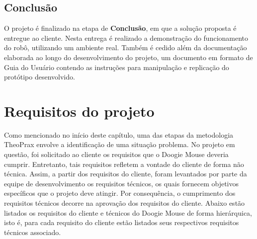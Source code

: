 \subsection{Conclusão}
\label{metodologia_conclusao}
O projeto é finalizado na etapa de \textbf{Conclusão}, em que a solução proposta é entregue ao cliente. Nesta entrega é realizado a demonstração do funcionamento do robô, utilizando um ambiente real. Também é cedido além da documentação elaborada ao longo do desenvolvimento do projeto, um documento em formato de Guia do Usuário contendo as instruções para manipulação e replicação do protótipo desenvolvido.


\section{Requisitos do projeto}
\label{sec:requisitos_do_projeto}
Como mencionado no início deste capítulo, uma das etapas da metodologia TheoPrax envolve a identificação de uma situação problema. No projeto em questão, foi solicitado ao cliente os requisitos que o Doogie Mouse deveria cumprir. Entretanto, tais requisitos refletem a vontade do cliente de forma não técnica. Assim, a partir dos requisitos do cliente, foram levantados por parte da equipe de desenvolvimento os requisitos técnicos, os quais fornecem objetivos específicos que o projeto deve atingir. Por consequência, o cumprimento dos requisitos técnicos decorre na aprovação dos requisitos do cliente. Abaixo estão listados os requisitos do cliente e técnicos do Doogie Mouse de forma hierárquica, isto é, para cada requisito do cliente estão listados seus respectivos requisitos técnicos associado.

